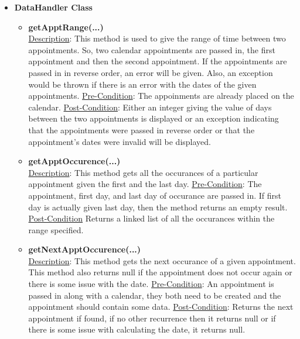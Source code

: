 \documentclass[12pt]{article}
\begin{document}
\begin{itemize}
\item \textbf {DataHandler Class}
	\begin{itemize}
	\item \textbf{getApptRange(...)}  \\
	\underline{Description}: This method is used to give the range of time between two appointments. So, two calendar appointments are passed in, the first appointment and then the second appointment. If the appointments are passed in in reverse order, an error will be given. Also, an exception would be thrown if there is an error with the dates of the given appointments. \newline
	\underline{Pre-Condition}: The appoinments are already placed on the calendar. \newline
	\underline{Post-Condition}: Either an integer giving the value of days between the two appointments is displayed or an exception indicating that the appointments were passed in reverse order or that the appointment's dates were invalid will be displayed. 

	\item \textbf{getApptOccurence(...)} \\
	\underline{Description}: This method gets all the occurances of a particular appointment given the first and the last day. \newline
	\underline{Pre-Condition}: The appointment, first day, and last day of occurance are passed in. If first day is actually given last day, then the method returns an empty result. \newline
	\underline{Post-Condition} Returns a linked list of all the occurances within the range specified. 

	\item \textbf{getNextApptOccurence(...)}\\
	\underline{Description}: This method gets the next occurance of a given appointment. This method also returns null if the appointment does not occur again or there is some issue with the date. \newline
	\underline{Pre-Condition}: An appointment is passed in along with a calendar, they both need to be created and the appointment should contain some data. \newline
	\underline{Post-Condition}: Returns the next appointment if found, if no other recurrence then it returns null or if there is some issue with calculating the date, it returns null. 


\end{itemize}
\end{itemize}
\end{document}
